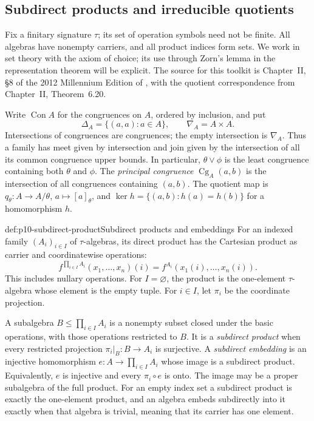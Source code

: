 
\subsection{Subdirect products and irreducible quotients}
\label{sec:p10-subdirect-products}

Fix a finitary signature \(\tau\); its set of operation symbols need not
be finite.  All algebras have nonempty carriers, and all product indices
form sets.  We work in set theory with the axiom of choice; its use
through Zorn's lemma in the representation theorem will be explicit.
The source for this toolkit is Chapter~II, \S8 of the 2012 Millennium
Edition of \textcite{BurrisSankappanavar2012}, with the quotient
correspondence from Chapter~II, Theorem~6.20.

Write \(\operatorname{Con}A\) for the congruences on \(A\), ordered by
inclusion, and put
\[
 \Delta_A=\{(a,a):a\in A\},\qquad \nabla_A=A\times A.
\]
Intersections of congruences are congruences; the empty intersection is
\(\nabla_A\).  Thus a family has meet given by intersection and join
given by the intersection of all its common congruence upper bounds.
In particular, \(\theta\vee\phi\) is the least congruence containing
both \(\theta\) and \(\phi\).  The \emph{principal congruence}
\(\operatorname{Cg}_A(a,b)\) is the intersection of all congruences
containing \((a,b)\).  The quotient map is
\(q_\theta:A\to A/\theta\), \(a\mapsto[a]_\theta\), and
\(\ker h=\{(a,b):h(a)=h(b)\}\) for a homomorphism \(h\).

\begin{hbdefinition}{def:p10-subdirect-product}{Subdirect products and embeddings}
For an indexed family \((A_i)_{i\in I}\) of \(\tau\)-algebras, its
direct product has the Cartesian product as carrier and coordinatewise
operations:
\[
 f^{\prod_{i\in I}A_i}(x_1,\ldots,x_n)(i)
       =f^{A_i}(x_1(i),\ldots,x_n(i)).
\]
This includes nullary operations.  For \(I=\varnothing\), the product
is the one-element \(\tau\)-algebra whose element is the empty tuple.
For \(i\in I\), let \(\pi_i\) be the coordinate projection.

A subalgebra \(B\leq\prod_{i\in I}A_i\) is a nonempty subset closed
under the basic operations, with those operations restricted to \(B\).
It is a \emph{subdirect product} when every restricted projection
\(\pi_i|_B:B\to A_i\) is surjective.
A \emph{subdirect embedding} is an injective homomorphism
\(e:A\to\prod_{i\in I}A_i\) whose image is a subdirect product.
Equivalently, \(e\) is injective and every \(\pi_i\circ e\) is onto.
The image may be a proper subalgebra of the full product.
For an empty index set a subdirect product is exactly the one-element
product, and an algebra embeds subdirectly into it exactly when that
algebra is trivial, meaning that its carrier has one element.
\end{hbdefinition}

